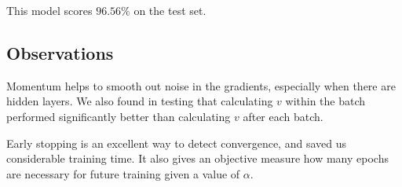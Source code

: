 This model scores $96.56\%$ on the test set.

\subsection{Observations}

Momentum helps to smooth out noise in the gradients, especially when there are hidden layers. We also found
in testing that calculating $v$ within the batch performed significantly better than calculating $v$ after each
batch.

Early stopping is an excellent way to detect convergence, and saved us considerable training time. It also gives
an objective measure how many epochs are necessary for future training given a value of $\alpha$.
